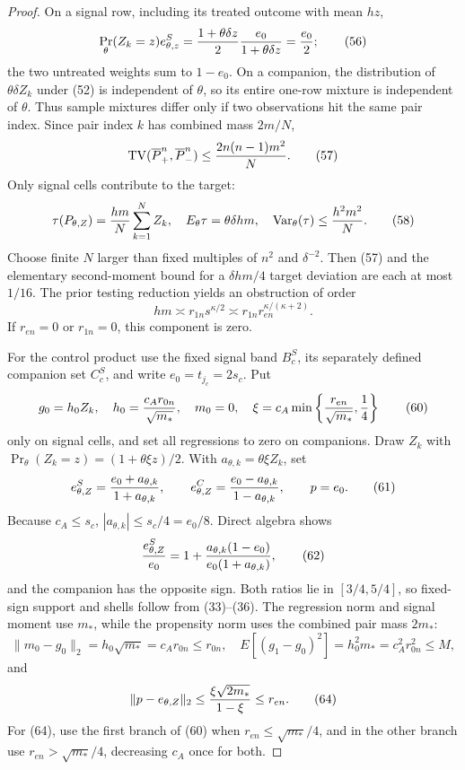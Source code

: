 \documentclass{article}
\begin{document}
\begin{proof}
On a signal row, including its treated outcome with mean \(hz\),
\[
\Pr_\theta(Z_k=z)e^S_{\theta,z}
={1+\theta\delta z\over2}{e_0\over1+\theta\delta z}
={e_0\over2};                                             \tag{56}
\]
the two untreated weights sum to \(1-e_0\).  On a companion, the distribution
of \(\theta\delta Z_k\) under (52) is independent of \(\theta\), so its entire
one-row mixture is independent of \(\theta\).  Thus sample mixtures differ only
if two observations hit the same pair index.  Since pair index \(k\) has
combined mass \(2m/N\),
\[
\operatorname{TV}(\overline P_+^n,\overline P_-^n)
\leq{2n(n-1)m^2\over N}.                                  \tag{57}
\]
Only signal cells contribute to the target:
\[
\tau(P_{\theta,Z})={hm\over N}\sum_{k=1}^NZ_k,\quad
E_\theta\tau=\theta\delta hm,\quad
\operatorname{Var}_\theta(\tau)\leq{h^2m^2\over N}.       \tag{58}
\]
Choose finite \(N\) larger than fixed multiples of \(n^2\) and
\(\delta^{-2}\).  Then (57) and the elementary second-moment bound for a
\(\delta hm/4\) target deviation are each at most \(1/16\).  The prior testing
reduction yields an obstruction of order
\[
hm\asymp r_{1n}s^{\kappa/2}
\asymp r_{1n}r_{en}^{\kappa/(\kappa+2)}.                   \tag{59}
\]
If \(r_{en}=0\) or \(r_{1n}=0\), this component is zero.

For the control product use the fixed signal band \(B_c^S\), its separately
defined companion set \(C_c^S\), and write \(e_0=t_{j_c}=2s_c\).  Put
\[
g_0=h_0Z_k,\quad h_0={c_A r_{0n}\over\sqrt{m_*}},\quad m_0=0,
\quad
\xi=c_A\min\left\{{r_{en}\over\sqrt{m_*}},{1\over4}\right\}           \tag{60}
\]
only on signal cells, and set all regressions to zero on companions.  Draw
\(Z_k\) with \(\Pr_\theta(Z_k=z)=(1+\theta\xi z)/2\).  With
\(a_{\theta,k}=\theta\xi Z_k\), set
\[
e^S_{\theta,Z}={e_0+a_{\theta,k}\over1+a_{\theta,k}},\quad\quad
e^C_{\theta,Z}={e_0-a_{\theta,k}\over1-a_{\theta,k}},\quad\quad p=e_0.       \tag{61}
\]
Because \(c_A\leq s_c\), \(|a_{\theta,k}|\leq s_c/4=e_0/8\).  Direct
algebra shows
\[
{e^S_{\theta,Z}\over e_0}
=1+{a_{\theta,k}(1-e_0)\over e_0(1+a_{\theta,k})},          \tag{62}
\]
and the companion has the opposite sign.  Both ratios lie in
\([3/4,5/4]\), so fixed-sign support and shells follow from (33)--(36).  The
regression norm and signal moment use \(m_*\), while the propensity norm uses
the combined pair mass \(2m_*\):
\[
\|m_0-g_0\|_2=h_0\sqrt{m_*}=c_A r_{0n}\leq r_{0n},
\quad E[(g_1-g_0)^2]=h_0^2m_*=c_A^2r_{0n}^2\leq M,          \tag{63}
\]
and
\[
\|p-e_{\theta,Z}\|_2
\leq{\xi\sqrt{2m_*}\over1-\xi}\leq r_{en}.               \tag{64}
\]
For (64), use the first branch of (60) when
\(r_{en}\leq\sqrt{m_*}/4\), and in the other branch use
\(r_{en}>\sqrt{m_*}/4\), decreasing \(c_A\) once for both.


\end{proof}
\end{document}

